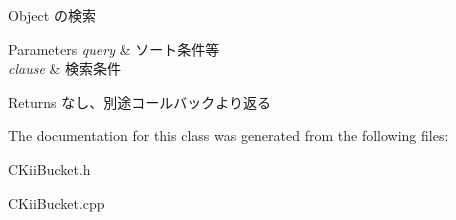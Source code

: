 Object の検索 


\begin{DoxyParams}{Parameters}
{\em query} & ソート条件等 \\
\hline
{\em clause} & 検索条件 \\
\hline
\end{DoxyParams}
\begin{DoxyReturn}{Returns}
なし、別途コールバックより返る 
\end{DoxyReturn}


The documentation for this class was generated from the following files\-:\begin{DoxyCompactItemize}
\item 
C\-Kii\-Bucket.\-h\item 
C\-Kii\-Bucket.\-cpp\end{DoxyCompactItemize}

